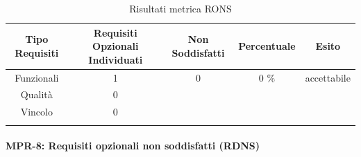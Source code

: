 \begin{center}
    \begin{longtable}{|c|c|c|c|c|}
        \hline
        \rowcolor{lighter-grayer}
        \textbf {Tipo Requisiti} & \textbf{Requisiti Opzionali Individuati} & \textbf{Non Soddisfatti} & \textbf{Percentuale} & \textbf{Esito} \\        \hline
        \endfirsthead

        \hline
        Funzionali & 1 & 0 & 0 \%  &  accettabile        \\
        Qualità & 0 &  &  &                        \\
        Vincolo & 0 & & &                        \\  
        \hline
        \rowcolor{white}
        \caption{Risultati metrica RONS}
    \end{longtable}
\end{center}


\newpage
\paragraph{MPR-8: Requisiti opzionali non soddisfatti (RDNS)}\label{_SV}

